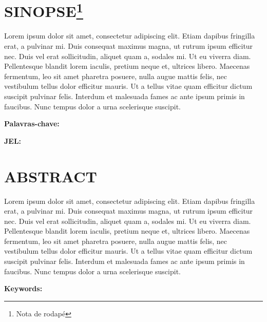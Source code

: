 \documentclass[
  12pt,
  a4paper,
]{template/td}
\begin{document}


\maketitle

\thispagestyle{fancy}

\section*{SINOPSE\footnote{Nota de rodapé}}

Lorem ipsum dolor sit amet, consectetur adipiscing elit. Etiam dapibus
fringilla erat, a pulvinar mi. Duis consequat maximus magna, ut rutrum
ipsum efficitur nec. Duis vel erat sollicitudin, aliquet quam a, sodales
mi. Ut eu viverra diam. Pellentesque blandit lorem iaculis, pretium
neque et, ultrices libero. Maecenas fermentum, leo sit amet pharetra
posuere, nulla augue mattis felis, nec vestibulum tellus dolor efficitur
mauris. Ut a tellus vitae quam efficitur dictum suscipit pulvinar felis.
Interdum et malesuada fames ac ante ipsum primis in faucibus. Nunc
tempus dolor a urna scelerisque suscipit.

\makeatletter
\textbf{Palavras-chave:} \@tdpchave
\makeatother

\makeatletter
\textbf{JEL:} \@tdjel
\makeatother

\section*{ABSTRACT}

Lorem ipsum dolor sit amet, consectetur adipiscing elit. Etiam dapibus
fringilla erat, a pulvinar mi. Duis consequat maximus magna, ut rutrum
ipsum efficitur nec. Duis vel erat sollicitudin, aliquet quam a, sodales
mi. Ut eu viverra diam. Pellentesque blandit lorem iaculis, pretium
neque et, ultrices libero. Maecenas fermentum, leo sit amet pharetra
posuere, nulla augue mattis felis, nec vestibulum tellus dolor efficitur
mauris. Ut a tellus vitae quam efficitur dictum suscipit pulvinar felis.
Interdum et malesuada fames ac ante ipsum primis in faucibus. Nunc
tempus dolor a urna scelerisque suscipit.

\makeatletter
\textbf{Keywords:} \@tdkwords
\makeatother
\end{document}
